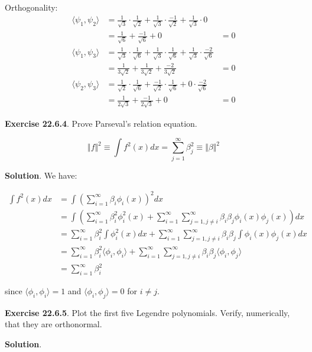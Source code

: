 Orthogonality: \[
\begin{align}
\langle \psi_1, \psi_2 \rangle &= \frac{1}{\sqrt{3}} \cdot \frac{1}{\sqrt{2}} + \frac{1}{\sqrt{3}} \cdot \frac{-1}{\sqrt{2}} + \frac{1}{\sqrt{3}} \cdot 0 \\&= \frac{1}{\sqrt{6}} + \frac{-1}{\sqrt{6}} + 0 &= 0 \\
\langle \psi_1, \psi_3 \rangle &= \frac{1}{\sqrt{3}} \cdot \frac{1}{\sqrt{6}} + \frac{1}{\sqrt{3}} \cdot \frac{1}{\sqrt{6}} + \frac{1}{\sqrt{3}} \cdot \frac{-2}{\sqrt{6}} \\&= \frac{1}{3\sqrt{2}} + \frac{1}{3\sqrt{2}} + \frac{-2}{3\sqrt{2}} &= 0 \\
\langle \psi_2, \psi_3 \rangle &= \frac{1}{\sqrt{2}} \cdot \frac{1}{\sqrt{6}} + \frac{-1}{\sqrt{2}} \cdot \frac{1}{\sqrt{6}} + 0 \cdot \frac{-2}{\sqrt{6}} \\&= \frac{1}{2\sqrt{3}} + \frac{-1}{2\sqrt{3}} + 0 &= 0 
\end{align}
\]

\textbf{Exercise 22.6.4}. Prove Parseval's relation equation.

\[ \Vert f \Vert^2 \equiv \int f^2(x) dx = \sum_{j=1}^\infty \beta_j^2 \equiv \Vert \beta \Vert^2\]

\textbf{Solution}. We have:

\[ 
\begin{align}
\int f^2(x) dx &= \int \left( \sum_{i=1}^\infty \beta_i \phi_i(x) \right)^2 dx \\
&= \int \left( \sum_{i=1}^\infty \beta_i^2 \phi_i^2(x) + \sum_{i=1}^\infty \sum_{j=1, j \neq i}^\infty \beta_i \beta_j \phi_i(x) \phi_j(x) \right) dx \\
&= \sum_{i=1}^\infty \beta_i^2 \int \phi_i^2(x) dx + \sum_{i=1}^\infty \sum_{j=1, j \neq i}^\infty \beta_i \beta_j  \int \phi_i(x) \phi_j(x) dx \\
&= \sum_{i=1}^\infty \beta_i^2 \langle \phi_i, \phi_i \rangle + \sum_{i=1}^\infty \sum_{j=1, j \neq i}^\infty \beta_i \beta_j \langle \phi_i, \phi_j \rangle \\
&= \sum_{i=1}^\infty \beta_i^2
\end{align}
\]

since \(\langle \phi_i, \phi_i \rangle = 1\) and
\(\langle \phi_i, \phi_j \rangle = 0\) for \(i \neq j\).

\textbf{Exercise 22.6.5}. Plot the first five Legendre polynomials.
Verify, numerically, that they are orthonormal.

\textbf{Solution}.

